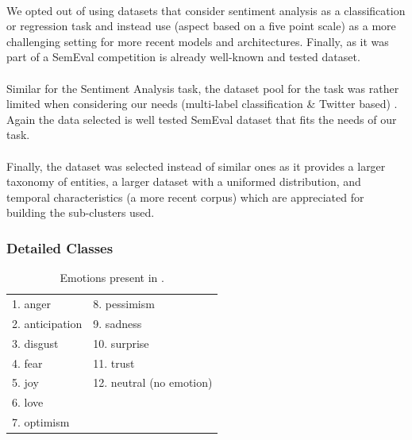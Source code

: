 \paragraph{{\TweetSentiment}} We opted out of using datasets that consider sentiment analysis as a classification \cite{8377739} or regression \cite{saad2019twitter} task and instead use \TweetSentiment (aspect based on a five point scale) as a more challenging setting for more recent models and architectures. Finally, as it was part of a SemEval competition \TweetSentiment is already well-known and tested dataset. 


\paragraph{{\TweetEmotion}} Similar for the Sentiment Analysis task, the dataset pool for the {\TweetEmotion} task was rather limited when considering our needs (multi-label classification \& Twitter based) \cite{balabantaray2012multi,strapparava2007semeval}. Again the data selected is well tested SemEval dataset that fits the needs of our task. 

\paragraph{{\TweetNER}}Finally, the {\TweetNER} dataset was selected instead of  similar ones \cite{rijhwani-preotiuc-pietro-2020-temporally,jiang-etal-2022-annotating,derczynski-etal-2017-results} as it provides a larger taxonomy of entities, a larger dataset with a uniformed distribution, and temporal characteristics (a more recent corpus) which are appreciated for building the sub-clusters used.

\subsubsection{Detailed Classes}
\begin{table}[ht]
\begin{tabular}{ll}
1. anger        & 8. pessimism                                                        \\
2. anticipation & 9. sadness                                                          \\
3. disgust      & 10. surprise                                                        \\
4. fear         & 11. trust                                                           \\
5. joy          & 12. neutral (no emotion) \\
6. love         &                                                                     \\
7. optimism     &                                                                    
\end{tabular}
\caption{Emotions present in {\TweetEmotion}.}
\label{appendix:SuperTweetEval-emotions_list}
\end{table}


